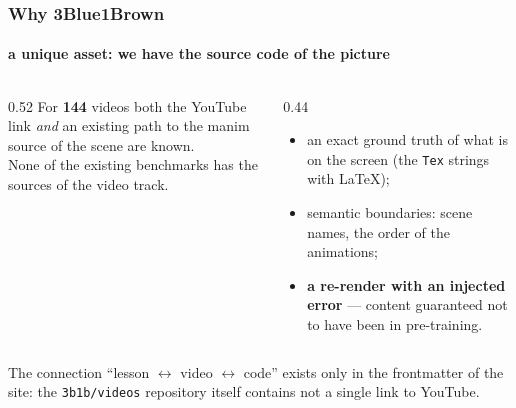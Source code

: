 \documentclass[aspectratio=169,10pt]{beamer}
\newcommand{\lead}[1]{{\color{warm}\textbf{#1}}}
\newcommand{\num}[1]{{\color{accent}\textbf{#1}}}
\begin{document}
\begin{frame}
  \frametitle{Why 3Blue1Brown}
  \framesubtitle{a unique asset: we have the source code of the picture}

  \begin{columns}[T]
    \begin{column}{0.52\textwidth}
      For \num{144} videos both the YouTube link \emph{and} an existing path to the
      manim source of the scene are known.\\[0.6em]
      None of the existing benchmarks has the sources of the video track.
    \end{column}
    \begin{column}{0.44\textwidth}
      \begin{itemize}
        \item an exact ground truth of what is on the screen (the \texttt{Tex} strings with \LaTeX);
        \item semantic boundaries: scene names, the order of the animations;
        \item \lead{a re-render with an injected error} — content guaranteed not to have
              been in pre-training.
      \end{itemize}
    \end{column}
  \end{columns}

  \vspace{1.0em}
  {\color{muted}\small
  The connection ``lesson $\leftrightarrow$ video $\leftrightarrow$ code'' exists only in the frontmatter of the site:
  the \texttt{3b1b/videos} repository itself contains not a single link to YouTube.}
\end{frame}
\end{document}
